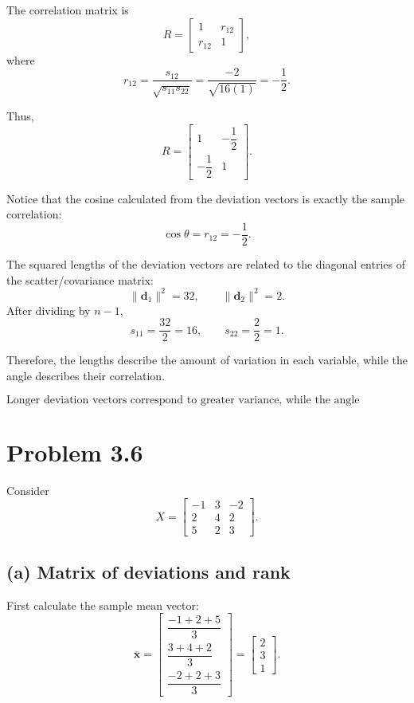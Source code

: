 \documentclass[12pt,a4paper]{article}
\begin{document}
The correlation matrix is
\[
R=
\begin{bmatrix}
1&r_{12}\\
r_{12}&1
\end{bmatrix},
\]
where
\[
r_{12}
=
\frac{s_{12}}{\sqrt{s_{11}s_{22}}}
=
\frac{-2}{\sqrt{16(1)}}
=
-\frac12.
\]

Thus,
\[
\boxed{
R=
\begin{bmatrix}
1&-\dfrac12\\[4pt]
-\dfrac12&1
\end{bmatrix}}.
\]

Notice that the cosine calculated from the deviation vectors is exactly the sample correlation:
\[
\boxed{\cos\theta=r_{12}=-\frac12}.
\]

The squared lengths of the deviation vectors are related to the diagonal entries of the scatter/covariance matrix:
\[
\|\mathbf{d}_1\|^2=32,
\qquad
\|\mathbf{d}_2\|^2=2.
\]
After dividing by \(n-1\),
\[
s_{11}=\frac{32}{2}=16,
\qquad
s_{22}=\frac{2}{2}=1.
\]

Therefore, the lengths describe the amount of variation in each variable, while the angle describes their correlation.

\[
\boxed{\text{Longer deviation vectors correspond to greater variance, while the angle determines the correlation.}}
\]

\newpage
\section{Problem 3.6}

Consider
\[
X=
\begin{bmatrix}
-1&3&-2\\
2&4&2\\
5&2&3
\end{bmatrix}.
\]

\subsection*{(a) Matrix of deviations and rank}

First calculate the sample mean vector:
\[
\overline{\mathbf{x}}
=
\begin{bmatrix}
\dfrac{-1+2+5}{3}\\[6pt]
\dfrac{3+4+2}{3}\\[6pt]
\dfrac{-2+2+3}{3}
\end{bmatrix}
=
\begin{bmatrix}
2\\3\\1
\end{bmatrix}.
\]
\end{document}
